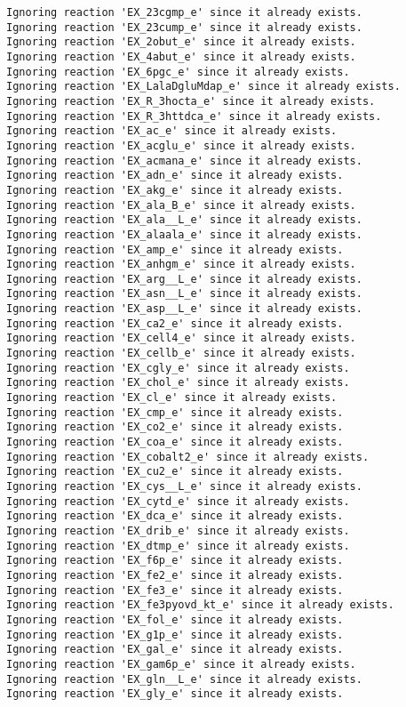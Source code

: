 \documentclass[
  letterpaper,
  DIV=11,
  numbers=noendperiod]{scrartcl}
\begin{document}
\begin{verbatim}
Ignoring reaction 'EX_23cgmp_e' since it already exists.
Ignoring reaction 'EX_23cump_e' since it already exists.
Ignoring reaction 'EX_2obut_e' since it already exists.
Ignoring reaction 'EX_4abut_e' since it already exists.
Ignoring reaction 'EX_6pgc_e' since it already exists.
Ignoring reaction 'EX_LalaDgluMdap_e' since it already exists.
Ignoring reaction 'EX_R_3hocta_e' since it already exists.
Ignoring reaction 'EX_R_3httdca_e' since it already exists.
Ignoring reaction 'EX_ac_e' since it already exists.
Ignoring reaction 'EX_acglu_e' since it already exists.
Ignoring reaction 'EX_acmana_e' since it already exists.
Ignoring reaction 'EX_adn_e' since it already exists.
Ignoring reaction 'EX_akg_e' since it already exists.
Ignoring reaction 'EX_ala_B_e' since it already exists.
Ignoring reaction 'EX_ala__L_e' since it already exists.
Ignoring reaction 'EX_alaala_e' since it already exists.
Ignoring reaction 'EX_amp_e' since it already exists.
Ignoring reaction 'EX_anhgm_e' since it already exists.
Ignoring reaction 'EX_arg__L_e' since it already exists.
Ignoring reaction 'EX_asn__L_e' since it already exists.
Ignoring reaction 'EX_asp__L_e' since it already exists.
Ignoring reaction 'EX_ca2_e' since it already exists.
Ignoring reaction 'EX_cell4_e' since it already exists.
Ignoring reaction 'EX_cellb_e' since it already exists.
Ignoring reaction 'EX_cgly_e' since it already exists.
Ignoring reaction 'EX_chol_e' since it already exists.
Ignoring reaction 'EX_cl_e' since it already exists.
Ignoring reaction 'EX_cmp_e' since it already exists.
Ignoring reaction 'EX_co2_e' since it already exists.
Ignoring reaction 'EX_coa_e' since it already exists.
Ignoring reaction 'EX_cobalt2_e' since it already exists.
Ignoring reaction 'EX_cu2_e' since it already exists.
Ignoring reaction 'EX_cys__L_e' since it already exists.
Ignoring reaction 'EX_cytd_e' since it already exists.
Ignoring reaction 'EX_dca_e' since it already exists.
Ignoring reaction 'EX_drib_e' since it already exists.
Ignoring reaction 'EX_dtmp_e' since it already exists.
Ignoring reaction 'EX_f6p_e' since it already exists.
Ignoring reaction 'EX_fe2_e' since it already exists.
Ignoring reaction 'EX_fe3_e' since it already exists.
Ignoring reaction 'EX_fe3pyovd_kt_e' since it already exists.
Ignoring reaction 'EX_fol_e' since it already exists.
Ignoring reaction 'EX_g1p_e' since it already exists.
Ignoring reaction 'EX_gal_e' since it already exists.
Ignoring reaction 'EX_gam6p_e' since it already exists.
Ignoring reaction 'EX_gln__L_e' since it already exists.
Ignoring reaction 'EX_gly_e' since it already exists.

\end{verbatim}
\end{document}
